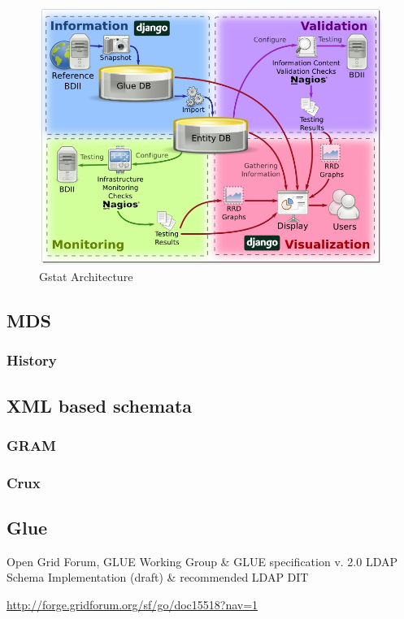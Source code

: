 \begin{figure}[htb]
\centering
\includegraphics[width=150mm]{images/gstat-architecture.jpg}
\caption{Gstat Architecture}
\label{figure:gstat-arch}
\end{figure}

\subsection{MDS}
\subsubsection{History}

\subsection{XML based schemata}
\subsubsection{GRAM}
\subsubsection{Crux}

\subsection{Glue}
Open Grid Forum, GLUE Working Group \& GLUE specification v. 2.0
LDAP Schema Implementation (draft) \& recommended LDAP DIT

\url{http://forge.gridforum.org/sf/go/doc15518?nav=1}


